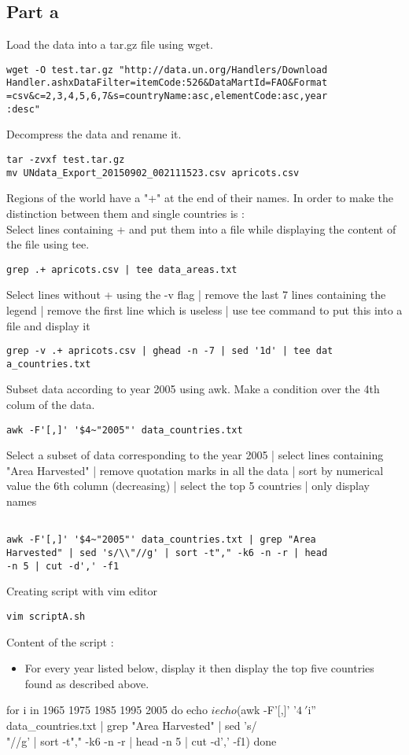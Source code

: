 \documentclass{llncs}\usepackage[]{graphicx}\usepackage[]{color}
\begin{document}
\subsection{Part a}
Load the data into a tar.gz file using wget.
\begin{lstlisting}[frame=single] 
wget -O test.tar.gz "http://data.un.org/Handlers/Download
Handler.ashxDataFilter=itemCode:526&DataMartId=FAO&Format
=csv&c=2,3,4,5,6,7&s=countryName:asc,elementCode:asc,year
:desc" 
\end{lstlisting}
Decompress the data and rename it.
\begin{lstlisting}[frame=single] 
tar -zvxf test.tar.gz 
mv UNdata_Export_20150902_002111523.csv apricots.csv
\end{lstlisting}
Regions of the world have a "+" at the end of their names. In order to make the distinction between them and single countries is : \\ 
Select lines containing + and put them into a file while displaying the content of the file using tee. 
\begin{lstlisting}[frame=single] 
grep .+ apricots.csv | tee data_areas.txt
\end{lstlisting}
Select lines without + using the -v flag | remove the last 7 lines containing the legend | remove the first line which is useless | use tee command to put this into a file and display it
\begin{lstlisting}[frame=single] 
grep -v .+ apricots.csv | ghead -n -7 | sed '1d' | tee dat
a_countries.txt
\end{lstlisting}
Subset data according to year 2005 using awk. Make a condition over the 4th colum of the data.
\begin{lstlisting}[frame=single] 
awk -F'[,]' '$4~"2005"' data_countries.txt
\end{lstlisting}
Select a subset of data corresponding to the year 2005 | select lines containing "Area Harvested" | remove quotation marks in all the data | sort by numerical value the 6th column (decreasing) | select the top 5 countries | only display names 
\begin{lstlisting}[frame=single]  % Start your code-block

awk -F'[,]' '$4~"2005"' data_countries.txt | grep "Area 
Harvested" | sed 's/\\"//g' | sort -t"," -k6 -n -r | head 
-n 5 | cut -d',' -f1
\end{lstlisting}
Creating script with vim editor
\begin{lstlisting}[frame=single] 
vim scriptA.sh
\end{lstlisting}
Content of the script :
\begin{itemize}
\item For every year listed below, display it then display the top five countries found as described above.
\end{itemize}
\begin{boxedverbatim}
for i in 1965 1975 1985 1995 2005
do
        echo $i
        echo $(awk -F'[,]' '$4~'$i'' data_countries.txt |
		grep "Area Harvested" | sed 's/\\"//g' | sort -t"," -k6 
-n -r | head -n 5 | cut -d',' -f1)
done 
\end{boxedverbatim}
\end{document}
